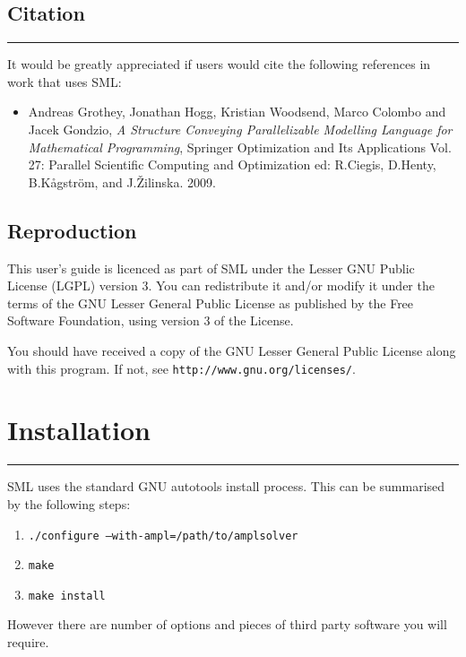 \documentclass[10pt,a4paper]{book}
\begin{document}
\section*{Citation}
\vspace{-0.6cm}\rule{\textwidth}{0.4ex}\vspace{0.1cm}

\noindent 
It would be greatly appreciated if users would cite the following references
in work that uses SML:
\begin{itemize}
   \item {\sc Andreas Grothey, Jonathan Hogg, Kristian Woodsend, Marco Colombo and Jacek Gondzio}, {\it A Structure Conveying Parallelizable Modelling Language for Mathematical Programming}, {Springer Optimization and Its Applications Vol. 27: Parallel Scientific Computing and Optimization ed: R.Ciegis, D.Henty, B.K\r{a}gstr\"{o}m, and J.\v{Z}ilinska. 2009.}
\end{itemize}

\section*{Reproduction}
This user's guide is licenced as part of SML under the Lesser GNU Public
License (LGPL) version 3. You can redistribute it and/or modify it under the
terms of the GNU Lesser General Public License as published by the Free
Software Foundation, using version 3 of the License.

You should have received a copy of the GNU Lesser General Public License
along with this program. If not, see {\tt http://www.gnu.org/licenses/}.

\chapter{Installation}
\vspace{-0.6cm}\rule{\textwidth}{0.4ex}\vspace{0.1cm}
SML uses the standard GNU autotools install process. This can be summarised
by the following steps:
\begin{enumerate}
   \item {\tt ./configure --with-ampl=/path/to/amplsolver}
   \item {\tt make}
   \item {\tt make install}
\end{enumerate}

However there are number of options and pieces of third party software you will
require.
\end{document}
